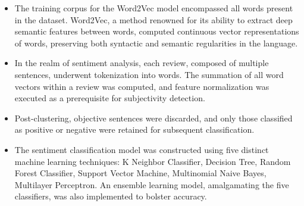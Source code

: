 \documentclass[a4paper, 12pt]{report}
\begin{document}
\begin{itemize}
	\item The training corpus for the Word2Vec model encompassed all words present in the dataset. Word2Vec, a method renowned for its ability to extract deep semantic features between words, computed continuous vector representations of words, preserving both syntactic and semantic regularities in the language.
	\item In the realm of sentiment analysis, each review, composed of multiple sentences, underwent tokenization into words. The summation of all word vectors within a review was computed, and feature normalization was executed as a prerequisite for subjectivity detection.
	\item Post-clustering, objective sentences were discarded, and only those classified as positive or negative were retained for subsequent classification.
	\item The sentiment classification model was constructed using five distinct machine learning techniques: K Neighbor Classifier, 
	Decision Tree,
	Random Forest Classifier,
	Support Vector Machine, 
	Multinomial Naive Bayes, 
	Multilayer Perceptron. An ensemble learning model, amalgamating the five classifiers, was also implemented to bolster accuracy.
\end{itemize}
\end{document}
